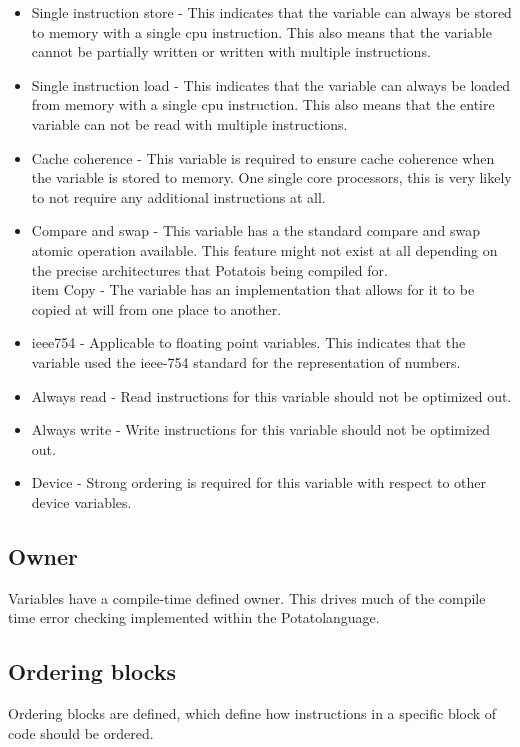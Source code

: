 \documentclass[12pt]{article}
\newcommand{\progLangNameSpace}{Potato\space }
\begin{document}
\begin{itemize}
\item Single instruction store - This indicates that the variable can always be stored to memory with a single cpu instruction. This also means that the variable cannot be partially written or written with multiple instructions.
\item Single instruction load - This indicates that the variable can always be loaded from memory with a single cpu instruction. This also means that the entire variable can not be read with multiple instructions.
\item Cache coherence - This variable is required to ensure cache coherence when the variable is stored to memory. One single core processors, this is very likely to not require any additional instructions at all.
\item Compare and swap - This variable has a the standard compare and swap atomic operation available. This feature might not exist at all depending on the precise architectures that \progLangNameSpace is being compiled for.
\\item Copy - The variable has an implementation that allows for it to be copied at will from one place to another.
\item ieee754 - Applicable to floating point variables. This indicates that the variable used the ieee-754 standard for the representation of numbers.
\item Always read - Read instructions for this variable should not be optimized out.
\item Always write - Write instructions for this variable should not be optimized out.
\item Device - Strong ordering is required for this variable with respect to other device variables.
\end{itemize}

\subsection {Owner}

Variables have a compile-time defined owner. This drives much of the compile time error checking implemented within the \progLangNameSpace language.

\subsection {Ordering blocks}

Ordering blocks are defined, which define how instructions in a specific block of code should be ordered.
\end{document}
